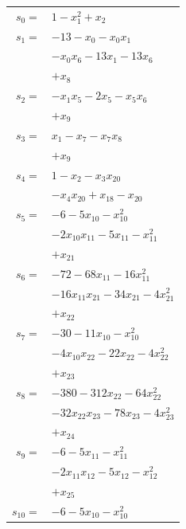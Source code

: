 \begingroup
\small
\setlength{\tabcolsep}{2pt}
\setlength{\LTleft}{0pt}
\begin{longtable}{@{}r@{\;}l@{}}
\(s_{0}=\) & \(\displaystyle 1 -x_{1}^{2} +x_{2}\) \\[3pt]
\(s_{1}=\) & \(\displaystyle -13 -x_{0} -x_{0}x_{1}\) \\
 & \(\displaystyle -x_{0}x_{6} -13x_{1} -13x_{6}\) \\
 & \(\displaystyle +x_{8}\) \\[3pt]
\(s_{2}=\) & \(\displaystyle -x_{1}x_{5} -2x_{5} -x_{5}x_{6}\) \\
 & \(\displaystyle +x_{9}\) \\[3pt]
\(s_{3}=\) & \(\displaystyle x_{1} -x_{7} -x_{7}x_{8}\) \\
 & \(\displaystyle +x_{9}\) \\[3pt]
\(s_{4}=\) & \(\displaystyle 1 -x_{2} -x_{3}x_{20}\) \\
 & \(\displaystyle -x_{4}x_{20} +x_{18} -x_{20}\) \\[3pt]
\(s_{5}=\) & \(\displaystyle -6 -5x_{10} -x_{10}^{2}\) \\
 & \(\displaystyle -2x_{10}x_{11} -5x_{11} -x_{11}^{2}\) \\
 & \(\displaystyle +x_{21}\) \\[3pt]
\(s_{6}=\) & \(\displaystyle -72 -68x_{11} -16x_{11}^{2}\) \\
 & \(\displaystyle -16x_{11}x_{21} -34x_{21} -4x_{21}^{2}\) \\
 & \(\displaystyle +x_{22}\) \\[3pt]
\(s_{7}=\) & \(\displaystyle -30 -11x_{10} -x_{10}^{2}\) \\
 & \(\displaystyle -4x_{10}x_{22} -22x_{22} -4x_{22}^{2}\) \\
 & \(\displaystyle +x_{23}\) \\[3pt]
\(s_{8}=\) & \(\displaystyle -380 -312x_{22} -64x_{22}^{2}\) \\
 & \(\displaystyle -32x_{22}x_{23} -78x_{23} -4x_{23}^{2}\) \\
 & \(\displaystyle +x_{24}\) \\[3pt]
\(s_{9}=\) & \(\displaystyle -6 -5x_{11} -x_{11}^{2}\) \\
 & \(\displaystyle -2x_{11}x_{12} -5x_{12} -x_{12}^{2}\) \\
 & \(\displaystyle +x_{25}\) \\[3pt]
\(s_{10}=\) & \(\displaystyle -6 -5x_{10} -x_{10}^{2}\) \\

\end{longtable}
